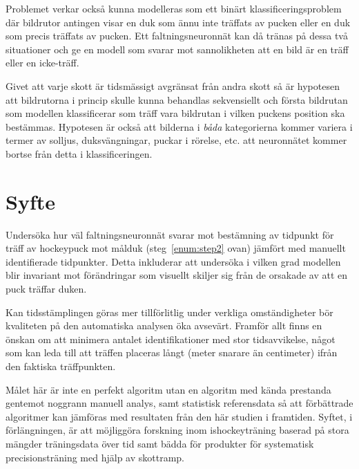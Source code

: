 \documentclass[a4paper,12pt]{article}
\begin{document}
Problemet verkar också kunna modelleras som ett binärt klassificeringsproblem
där bildrutor antingen visar en duk som ännu inte träffats av pucken eller
en duk som precis träffats av pucken. Ett faltningsneuronnät kan då tränas på
dessa två situationer och ge en modell som svarar mot sannolikheten att en
bild är en träff eller en icke-träff.

Givet att varje skott är tidsmässigt avgränsat från andra skott så är
hypotesen att bildrutorna i princip skulle kunna behandlas sekvensiellt och
första bildrutan som modellen klassificerar som träff vara bildrutan i
vilken puckens position ska bestämmas. Hypotesen är också att bilderna
i \textit{båda} kategorierna kommer variera i termer av solljus,
duksvängningar, puckar i rörelse, etc. att neuronnätet kommer bortse från
detta i klassificeringen.


\section*{Syfte}
Undersöka hur väl faltningsneuronnät svarar mot bestämning av tidpunkt för
träff av hockeypuck mot målduk (steg~\ref{enum:step2} ovan) jämfört med
manuellt identifierade tidpunkter. Detta inkluderar att undersöka i vilken
grad modellen blir invariant mot förändringar som visuellt skiljer sig från de
orsakade av att en puck träffar duken.

Kan tidsstämplingen göras mer tillförlitlig under verkliga omständigheter bör
kvaliteten på den automatiska analysen öka avsevärt. Framför allt finns en
önskan om att minimera antalet identifikationer med stor tidsavvikelse, något
som kan leda till att träffen placeras långt (meter snarare än centimeter)
ifrån den faktiska träffpunkten.

Målet här är inte en perfekt algoritm utan en algoritm med kända prestanda
gentemot noggrann manuell analys, samt statistisk referensdata så att
förbättrade algoritmer kan jämföras med resultaten från den här studien i
framtiden. Syftet, i förlängningen, är att möjliggöra forskning inom
ishockeyträning baserad på stora mängder träningsdata över tid samt bädda för
produkter för systematisk precisionsträning med hjälp av skottramp.
\end{document}
